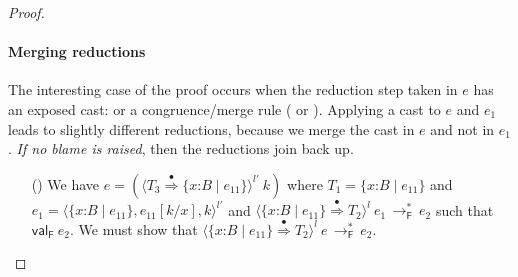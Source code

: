 \documentclass[9pt]{extarticle}
\newcommand{\ottnt}[1]{\mathit{#1}}
\newcommand{\ottsym}[1]{#1}
\begin{document}
{\begin{lemma}
\begin{proof}
{    \paragraph{Merging reductions}
The interesting case of the proof occurs when the reduction step
    taken in $\ottnt{e}$ has an exposed cast:  or a
    congruence/merge rule ( or ).
Applying a cast to $\ottnt{e}$ and $\ottnt{e_{{\mathrm{1}}}}$ leads to slightly
    different reductions, because we merge the cast in $\ottnt{e}$
    and not in $\ottnt{e_{{\mathrm{1}}}}$. \textit{If no blame is raised}, then the
    reductions join back up.
\begin{itemize}
    \item[(\E{CheckNone})] We have $\ottnt{e}  \ottsym{=}   (  \langle  \ottnt{T_{{\mathrm{3}}}}  \mathord{ \overset{\bullet}{\Rightarrow} }   \{ \mathit{x} \mathord{:} \ottnt{B} \mathrel{\mid} \ottnt{e_{{\mathrm{11}}}} \}   \rangle^{ \ottnt{l'} } ~  \ottnt{k}  ) $ where
      $\ottnt{T_{{\mathrm{1}}}}  \ottsym{=}   \{ \mathit{x} \mathord{:} \ottnt{B} \mathrel{\mid} \ottnt{e_{{\mathrm{11}}}} \} $ and $\ottnt{e_{{\mathrm{1}}}}  \ottsym{=}   \langle   \{ \mathit{x} \mathord{:} \ottnt{B} \mathrel{\mid} \ottnt{e_{{\mathrm{11}}}} \}  ,   \ottnt{e_{{\mathrm{11}}}}  [  \ottnt{k} / \mathit{x}  ]  ,  \ottnt{k}  \rangle^{ \ottnt{l'} } $ and
      $ \langle   \{ \mathit{x} \mathord{:} \ottnt{B} \mathrel{\mid} \ottnt{e_{{\mathrm{11}}}} \}   \mathord{ \overset{\bullet}{\Rightarrow} }  \ottnt{T_{{\mathrm{2}}}}  \rangle^{ \ottnt{l} } ~  \ottnt{e_{{\mathrm{1}}}}  \,  \longrightarrow ^{*}_{  \mathsf{F}  }  \, \ottnt{e_{{\mathrm{2}}}}$ such that $ \mathsf{val} _{  \mathsf{F}  }~ \ottnt{e_{{\mathrm{2}}}} $. We
      must show that $ \langle   \{ \mathit{x} \mathord{:} \ottnt{B} \mathrel{\mid} \ottnt{e_{{\mathrm{11}}}} \}   \mathord{ \overset{\bullet}{\Rightarrow} }  \ottnt{T_{{\mathrm{2}}}}  \rangle^{ \ottnt{l} } ~  \ottnt{e}  \,  \longrightarrow ^{*}_{  \mathsf{F}  }  \, \ottnt{e_{{\mathrm{2}}}}$.


\end{itemize}}
\end{proof}
\end{lemma}}
\end{document}

